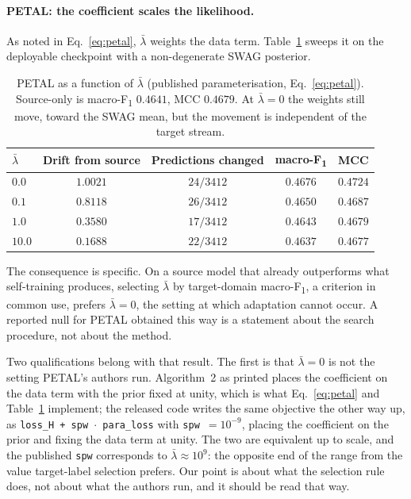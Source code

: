 \documentclass[a4paper,fleqn]{cas-dc}
\newcommand{\macf}{macro-F\textsubscript{1}}
\begin{document}
\paragraph{PETAL: the coefficient scales the likelihood.} As noted in
Eq.~\ref{eq:petal}, $\bar\lambda$ weights the data term. Table~\ref{tab:lambda} sweeps it
on the deployable checkpoint with a non-degenerate SWAG posterior.

\begin{table}[t]
\centering
\caption{PETAL as a function of $\bar\lambda$ (published parameterisation,
Eq.~\ref{eq:petal}). Source-only is \macf{} $0.4641$, MCC $0.4679$. At $\bar\lambda=0$
the weights still move, toward the SWAG mean, but the movement is independent of
the target stream.}
\label{tab:lambda}
\small
\begin{tabular}{lcccc}
\toprule
$\bar\lambda$ & Drift from source & Predictions changed & \macf & MCC \\
\midrule
$0.0$  & $1.0021$ & $24/3412$ & $0.4676$ & $0.4724$ \\
$0.1$  & $0.8118$ & $26/3412$ & $0.4650$ & $0.4687$ \\
$1.0$  & $0.3580$ & $17/3412$ & $0.4643$ & $0.4679$ \\
$10.0$ & $0.1688$ & $22/3412$ & $0.4637$ & $0.4677$ \\
\bottomrule
\end{tabular}
\end{table}

The consequence is specific. On a source model that already outperforms what self-training
produces, selecting $\bar\lambda$ by target-domain \macf{}, a criterion in common use,
prefers $\bar\lambda=0$, the setting at which adaptation cannot occur. A reported null for
PETAL obtained this way is a statement about the search procedure, not about the method.

Two qualifications belong with that result. The first is that $\bar\lambda=0$ is not the
setting PETAL's authors run. Algorithm~2 as printed places the coefficient on the data term
with the prior fixed at unity, which is what Eq.~\ref{eq:petal} and
Table~\ref{tab:lambda} implement; the released code writes the same objective the other way
up, as \texttt{loss\_H + spw\,$\cdot$\,para\_loss} with \texttt{spw}~$=10^{-9}$, placing the
coefficient on the prior and fixing the data term at unity. The two are equivalent up to
scale, and the published \texttt{spw} corresponds to $\bar\lambda\approx10^{9}$: the
opposite end of the range from the value target-label selection prefers. Our point is about
what the selection rule does, not about what the authors run, and it should be read that
way.
\end{document}
